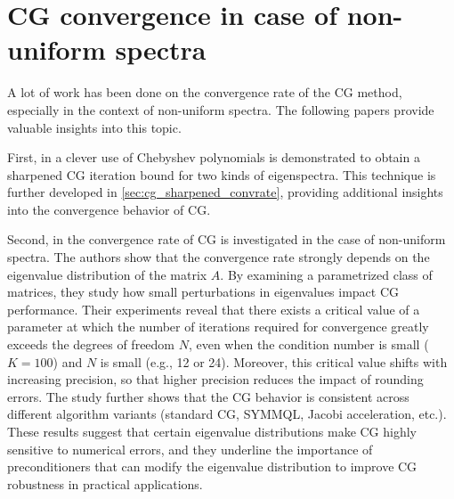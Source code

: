 \section{CG convergence in case of non-uniform spectra}\label{sec:cg_nonuniform_spectra}
A lot of work has been done on the convergence rate of the CG method, especially in the context of non-uniform spectra. The following papers provide valuable insights into this topic.

First, in \cite{cg_sharpened_convrate_Axelsson1976} a clever use of Chebyshev polynomials is demonstrated to obtain a sharpened CG iteration bound for two kinds of eigenspectra. This technique is further developed in \cref{sec:cg_sharpened_convrate}, providing additional insights into the convergence behavior of CG.

Second, in \cite{cg_convrate_Strakos1991} the convergence rate of CG is investigated in the case of non-uniform spectra. The authors show that the convergence rate strongly depends on the eigenvalue distribution of the matrix \(A\). By examining a parametrized class of matrices, they study how small perturbations in eigenvalues impact CG performance. Their experiments reveal that there exists a critical value of a parameter at which the number of iterations required for convergence greatly exceeds the degrees of freedom \(N\), even when the condition number is small (\(K=100\)) and \(N\) is small (e.g., 12 or 24). Moreover, this critical value shifts with increasing precision, so that higher precision reduces the impact of rounding errors. The study further shows that the CG behavior is consistent across different algorithm variants (standard CG, SYMMQL, Jacobi acceleration, etc.). These results suggest that certain eigenvalue distributions make CG highly sensitive to numerical errors, and they underline the importance of preconditioners that can modify the eigenvalue distribution to improve CG robustness in practical applications.

